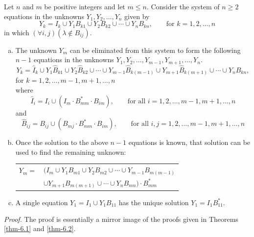 \begin{thm}\label{thm-6.4}
Let $n$ and $m$ be positive integers and let $m \leq n$. Consider the system of
$n \geq 2$ equations in the unknowns $Y_1,Y_2,\ldots,Y_n$ given by
\[ Y_k = I_k\cup Y_1B_{k1} \cup Y_2B_{k2} \cup\cdots\cup Y_nB_{kn},\qquad
	\text{for }k = 1,2,\ldots,n \]
in which $(\forall i,j)(\lambda \not \in B_{ij})$.
\begin{enumerate}[a.]
\item The unknown $Y_m$ can be eliminated from this system to form the following
$n-1$ equations in the unknowns $Y_1,Y_2, \ldots , Y_{m-1},Y_{m+1},\ldots,Y_n$.
\[ Y_k = \hat{I}_k \cup Y_1\hat{B}_{k1} \cup Y_2\hat{B}_{k2} \cup\cdots\cup
	Y_{m-1}\hat{B}_{k(m-1)}\cup Y_{m+1}\hat{B}_{k(m+1)} \cup\cdots\cup
	Y_n\hat{B}_{kn}, \]
for $k = 1,2, \ldots ,m-1,m+1,\ldots, n$ \\
where
\[ \hat{I}_i=  I_i \cup(I_m \cdot B^*_{mm} \cdot B_{im}),\qquad\text{for all }
	i = 1,2,\ldots,m-1,m+1,\ldots,n \]
and
\[ \hat{B}_{ij} = B_{ij} \cup (B_{mj}\cdot B^*_{mm} \cdot B_{im}),\qquad
	\text{for all }i,j = 1,2,\ldots,m-1,m+1,\ldots,n \]

\item Once the solution to the above $n - 1$ equations is known, that solution
can be used to find the remaining unknown:
\begin{center}\begin{tabular}{r@{ }l}
$Y_m =$ & $(I_m \cup Y_1B_{m1} \cup Y_2B_{m2} \cup\cdots\cup Y_{m-1}B_{m(m-1)}$ \\
& $\cup  Y_{m+1}B_{m(m+1)} \cup\cdots\cup Y_nB_{mn})\cdot B^*_{mm}$
\end{tabular}\end{center}

\item A single equation $Y_1=I_1 \cup Y_1B_{11}$ has the unique solution
$Y_1 = I_1B^*_{11}$.
\end{enumerate}

\emph{Proof.} The proof is essentially a mirror image of the proofs given in
Theorems \ref{thm-6.1} and \ref{thm-6.2}.
\end{thm}

